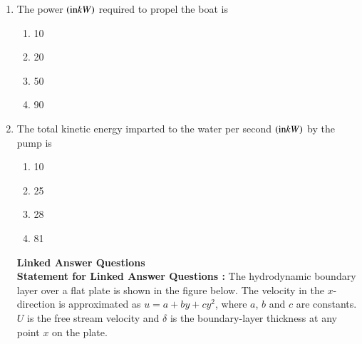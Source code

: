 \documentclass[journal]{IEEEtran}
\begin{document}
\begin{enumerate}[start=19]
\item The power $\left(\text{in} kW\right)$ required to propel the boat is
\begin{enumerate}
    \item 10
    \item 20
    \item 50
    \item 90
\end{enumerate}
\item The total kinetic energy imparted to the water per second $\left(\text{in} kW\right)$ by the pump is
\begin{enumerate}
    \item 10
    \item 25
    \item 28
    \item 81
\end{enumerate}
\textbf{Linked Answer Questions}\\
\textbf{Statement for Linked Answer Questions :}
The hydrodynamic boundary layer over a flat plate is shown in the figure below. The velocity in the $x$-direction is approximated as $u = a + by + cy^2$, where $a$, $b$ and $c$ are constants. $U$ is the free stream velocity and $\delta$ is the boundary-layer thickness at any point $x$ on the plate.
\end{enumerate}
\end{document}
